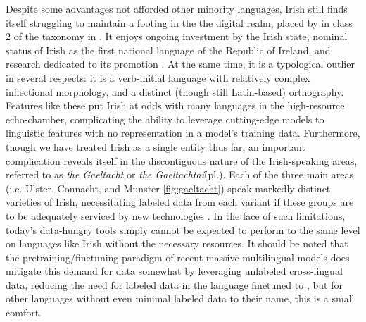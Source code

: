 \documentclass[thesis]{cluu}
\begin{document}
Despite some advantages not afforded other minority languages, Irish still finds itself struggling to maintain a footing in the the digital realm, placed by \textcite{joshiStateFateLinguistic2021} in class 2 of the taxonomy in . It enjoys ongoing investment by the Irish state, nominal status of Irish as the first national language of the Republic of Ireland, and research dedicated to its promotion \parencite[e.g. through the ABAIR initiative dedicated to developing speech technologies for Irish, see][]{chasaideABAIRInitiativeBringing2017}. At the same time, it is a typological outlier in several respects: it is a verb-initial language with relatively complex inflectional morphology, and a distinct (though still Latin-based) orthography. Features like these put Irish at odds with many languages in the high-resource echo-chamber, complicating the ability to leverage cutting-edge models to linguistic features with no representation in a model's training data. Furthermore, though we have treated Irish as a single entity thus far, an important complication reveals itself in the discontiguous nature of the Irish-speaking areas, referred to as \textit{the Gaeltacht} or \textit{the Gaeltachtaí}(pl.). Each of the three main areas (i.e. Ulster, Connacht, and Munster \ref{fig:gaeltacht}) speak markedly distinct varieties of Irish, necessitating labeled data from each variant if these groups are to be adequately serviced by new technologies \parencite{nichasaideCanWeDefuse2019}. In the face of such limitations, today's data-hungry tools simply cannot be expected to perform to the same level on languages like Irish without the necessary resources. It should be noted that the pretraining/finetuning paradigm of recent massive multilingual models does mitigate this demand for data somewhat by leveraging unlabeled cross-lingual data, reducing the need for labeled data in the language finetuned to \parencite{hedderichSurveyRecentApproaches2021,ranathungaNeuralMachineTranslation2021,joshiStateFateLinguistic2021}, but for other languages without even minimal labeled data to their name, this is a small comfort.
\end{document}

